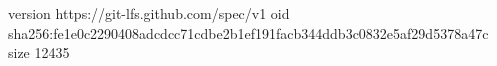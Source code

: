 version https://git-lfs.github.com/spec/v1
oid sha256:fe1e0c2290408adcdcc71cdbe2b1ef191facb344ddb3c0832e5af29d5378a47c
size 12435
